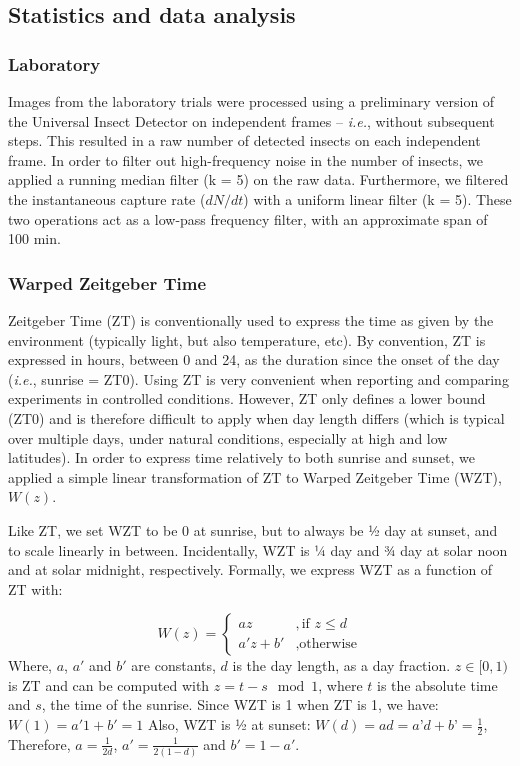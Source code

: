 \documentclass[12pt]{article}
\begin{document}
\begin{linenumbers}
		
		\subsection*{Statistics and data analysis}

		\subsubsection*{Laboratory}
		Images from the laboratory trials were processed using a preliminary version of the Universal Insect Detector on independent frames – \emph{i.e.}, without subsequent steps. This resulted in a raw number of detected insects on each independent frame. In order to filter out high-frequency noise in the number of insects, we applied a running median filter (k = 5) on the raw data. Furthermore, we filtered the instantaneous capture rate ($dN/dt$) with a uniform linear filter (k = 5). These two operations act as a low-pass frequency filter, with an approximate span of 100 min.

		\subsubsection*{Warped Zeitgeber Time}
		Zeitgeber Time (ZT) is conventionally used to express the time as given by the environment (typically light, but also temperature, etc). By convention, ZT is expressed in hours, between 0 and 24, as the duration since the onset of the day (\emph{i.e.}, sunrise = ZT0). Using ZT is very convenient when reporting and comparing experiments in controlled conditions. However, ZT only defines a lower bound (ZT0) and is therefore difficult to apply when day length differs (which is typical over multiple days, under natural conditions, especially at high and low latitudes). In order to express time relatively to both sunrise and sunset, we applied a simple linear transformation of ZT to Warped Zeitgeber Time (WZT), $W(z)$.

		Like ZT, we set WZT to be 0 at sunrise, but to always be ½ day at sunset, and to scale linearly in between. Incidentally, WZT is ¼ day and ¾ day at solar noon and at solar midnight, respectively.
		Formally, we express WZT as a function of ZT with:

		$$W(z)= \begin{cases}
			az  &,  \text{if } z \leq d  \\
			a'z + b' &,  \text{otherwise}
		\end{cases}$$
		Where, $a$, $a'$ and $b'$ are constants, $d$ is the day length, as a day fraction. $z \in [0,1)$ is ZT and can be computed with $z = t - s \mod 1$, where $t$ is the absolute time and $s$, the time of the sunrise. Since WZT is 1 when ZT is 1, we have:
		$W(1) = a' 1 + b' = 1$
		Also, WZT is ½ at sunset: $W(d) = ad = a’d +b’ = \frac{1}{2}$, 
		Therefore, $a = \frac{1}{2 d}$, $a' = \frac{1}{2 (1 - d)}$ and $b' = 1 - a'$.


\end{linenumbers}
\end{document}
